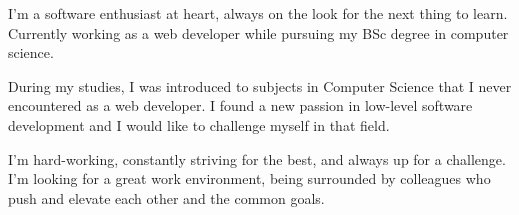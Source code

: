 

\begin{cvparagraph}

I'm a software enthusiast at heart, always on the look for the next thing to learn. Currently working as a web developer while pursuing my BSc degree in computer science.

During my studies, I was introduced to subjects in Computer Science that I never encountered as a web developer. I found a new passion in low-level software development and I would like to challenge myself in that field.

I'm hard-working, constantly striving for the best, and always up for a challenge.
I'm looking for a great work environment, being surrounded by colleagues who push and elevate each other and the common goals.
\end{cvparagraph}